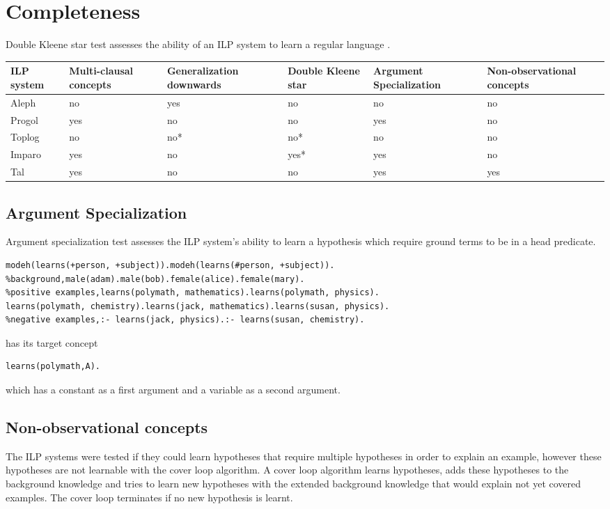 \section{Completeness}
Double Kleene star test assesses the ability of an ILP system to learn a regular language .
\begin{center}
    \begin{tabular}{ | p{2cm} | p{2cm} | p{2cm} | p{2cm} | p{2cm} | p{2cm} |}
    \hline
    ILP system & Multi-clausal concepts & Generalization downwards &
    Double Kleene star & Argument Specialization &
    Non-observational concepts\\ \hline
    Aleph & no & yes & no & no & no\\ \hline
    Progol & yes & no & no & yes & no\\ \hline
    Toplog & no & no* & no* & no & no\\ \hline
    Imparo & yes & no & yes* & yes & no\\ \hline
    Tal & yes & no & no & yes & yes\\ \hline
    \hline
    \end{tabular}
\end{center}

\subsection{Argument Specialization}
Argument specialization test assesses the ILP system's ability to learn a hypothesis which require ground terms to be in a head predicate.
\begin{lstlisting}
modeh(learns(+person, +subject)).modeh(learns(#person, +subject)).
%background,male(adam).male(bob).female(alice).female(mary).
%positive examples,learns(polymath, mathematics).learns(polymath, physics).
learns(polymath, chemistry).learns(jack, mathematics).learns(susan, physics).
%negative examples,:- learns(jack, physics).:- learns(susan, chemistry).
\end{lstlisting}
has its target concept
\begin{lstlisting}
learns(polymath,A).
\end{lstlisting}
which has a constant  as a first argument and a variable as a second argument.

\subsection{Non-observational concepts}
The ILP systems were tested if they could learn hypotheses that require multiple hypotheses in order to explain an example, however these hypotheses are not learnable with the cover loop algorithm. A cover loop algorithm learns hypotheses, adds these hypotheses to the background knowledge and tries to learn new hypotheses with the extended background knowledge that would explain not yet covered examples. The cover loop terminates if no new hypothesis is learnt.

